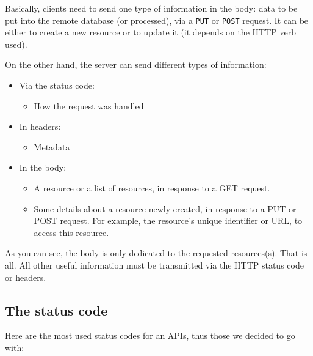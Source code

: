 \medskip

Basically, clients need to send one type of information in the body: data to be put into the remote database (or processed), via a \lstinline{PUT} or \lstinline{POST} request. It can be either to create a new resource or to update it (it depends on the HTTP verb used).

\medskip

On the other hand, the server can send different types of information:

\begin{itemize}
  \item Via the status code:
  \begin{itemize}
    \item How the request was handled
  \end{itemize}
  \item In headers:
  \begin{itemize}
    \item Metadata
  \end{itemize}
  \item In the body:
  \begin{itemize}
  \item A resource or a list of resources, in response to a GET request.
  \item Some details about a resource newly created, in response to a PUT or POST request. For example, the resource's unique identifier or URL, to access this resource.
  \end{itemize}
\end{itemize}

As you can see, the body is only dedicated to the requested resources(s). That is all. All other useful information must be transmitted via the HTTP status code or headers.

\subsection{The status code}

Here are the most used status codes for an APIs, thus those we decided to go with:

